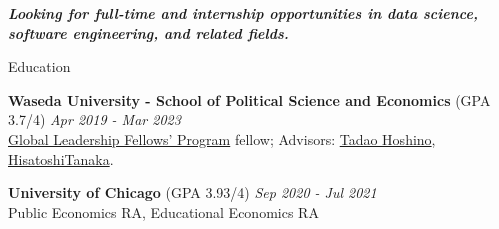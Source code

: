 \documentclass{resume} %
\begin{document}
{\centerline {\em \textbf { Looking for full-time and internship opportunities in data science, software engineering, and related fields. } } }

\begin{rSection}{Education}

{\bf Waseda University - School of Political Science and Economics }(GPA 3.7/4) \hfill {\em Apr 2019 - Mar 2023} 
\\\href{http://www2.cie-waseda.jp/glfp/jp/about/program.html}{Global Leadership Fellows' Program} fellow; Advisors: \href{https://tadaohoshino.wordpress.com/}{Tadao Hoshino}, \href{https://waseda.pure.elsevier.com/en/persons/hisatoshi-tanaka}{HisatoshiTanaka}.

{\bf University of Chicago }(GPA 3.93/4) \hfill {\em Sep 2020 - Jul 2021} 
\\Public Economics RA, Educational Economics RA

%


\end{rSection}
\end{document}
